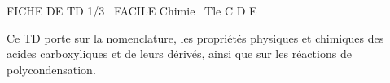 \documentclass[11pt]{article}
\begin{document}
\begin{tcolorbox}[enhanced,colback=popink,colframe=popink,arc=10pt,boxrule=0pt,left=12pt,right=12pt,top=9pt,bottom=9pt]
{\color{white}\popxbold\small FICHE DE TD 1/3 \textbullet\ FACILE \hfill Chimie \textbullet\ Tle C D E\par}
\end{tcolorbox}
\vspace{4pt}
Ce TD porte sur la nomenclature, les propriétés physiques et chimiques des acides carboxyliques et de leurs dérivés, ainsi que sur les réactions de polycondensation.
\end{document}
